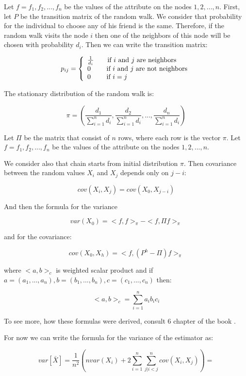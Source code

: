 \documentclass[12pt]{report}
\begin{document}
Let $f = {f_1 , f_2, ..., f_n}$ be the values of the attribute on the nodes $1, 2, ..., n$.
First, let $P$ be the transition matrix of the random walk. We consider that probability for the individual to choose any of his friend is the same. Therefore, if the random walk visits the node $i$ then one of the neighbors of this node will be chosen with probability $d_i$. Then we can write the transition matrix:


\[
    p_{ij}=\left\{
                \begin{array}{ll}
                  \frac{1}{d_i} \qquad \textnormal{if $i$ and $j$ are neighbors} \\
                  0 \qquad \textnormal{ if $i$ and $j$ are not neighbors}\\
                  0 \qquad \textnormal{ if $i = j$}
                \end{array}
              \right.
  \]
  
The stationary distribution of the random walk is:

$$\pi = \left( \frac{d_1}{\sum_{i=1}^n d_i}, \frac{d_2}{\sum_{i=1}^n d_i},..., \frac{d_n}{\sum_{i=1}^n d_i}\right)$$
  

Let $\Pi$ be the matrix that consist of $n$ rows, where each row is the vector $\pi$. Let $f = {f_1 , f_2, ..., f_n}$ be the values of the attribute on the nodes $1, 2, ..., n$.

We consider also that chain starts from initial distribution $\pi$. Then covariance between the random values $X_i$ and $X_j$ depends only on $j-i$:

$$cov(X_i, X_j) = cov (X_0, X_{j-i})$$

And then the formula for the variance

$$var(X_0) = <f, f>_{\pi} - <f, \Pi f>_{\pi}$$

and for the covariance:

$$cov(X_0, X_h) = <f, (P^h - \Pi)f>_{\pi}$$

where $<a,b>_c$ is weighted scalar product and if $a = (a_1, ..., a_n), b = (b_1, ..., b_n), c = (c_1, ..., c_n)$ then:

$$<a,b>_c = \sum_{i = 1}^n a_i b_i c_i$$

To see more, how these formulas were derived, consult 6 chapter of the book \cite{bremaud2013markov}.

For now we can write the formula for the variance of the estimator as:

$$ var\left[\bar{X} \right] = \frac{1}{n^2} \left( nvar(X_i) + 2\sum_{i=1}^n \sum_{j|i < j}^n cov(X_i, X_j)\right) = $$
\end{document}
